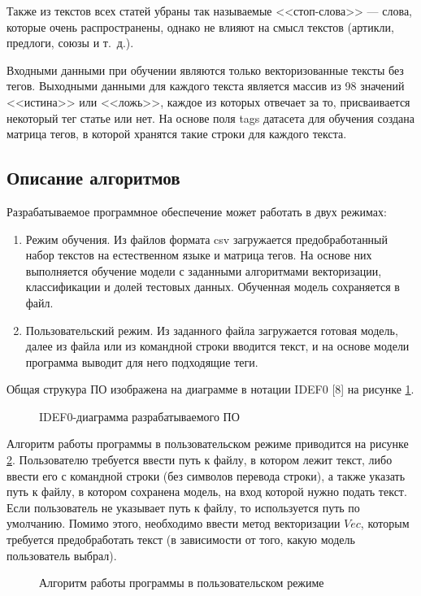 \documentclass[a4paper, 12pt]{article}
\begin{document}
\begin{large}
Также из текстов всех статей убраны так называемые <<стоп-слова>> --- слова, которые очень распространены, однако не влияют на смысл текстов (артикли, предлоги, союзы и т.~д.).

Входными данными при обучении являются только векторизованные тексты без тегов.
Выходными данными для каждого текста является массив из 98 значений <<истина>> или <<ложь>>, каждое из которых отвечает за то, присваивается некоторый тег статье или нет.
На основе поля tags датасета для обучения создана матрица тегов, в которой хранятся такие строки для каждого текста. 
\subsection{Описание алгоритмов}
Разрабатываемое программное обеспечение может работать в двух режимах:
\begin{enumerate}
    \item Режим обучения. Из файлов формата csv загружается предобработанный набор текстов на естественном языке и матрица тегов. На основе них выполняется обучение модели с заданными алгоритмами векторизации, классификации и долей тестовых данных. Обученная модель сохраняется в файл.
    \item Пользовательский режим. Из заданного файла загружается готовая модель, далее из файла или из командной строки вводится текст, и на основе модели программа выводит для него подходящие теги.
\end{enumerate}

Общая струкура ПО изображена на диаграмме в нотации IDEF0 [8] на рисунке \ref{idef}.

\begin{figure}[h!]
    \captionsetup{justification=centering}
    \caption{IDEF0-диаграмма разрабатываемого ПО}
    \label{idef}
\end{figure}

Алгоритм работы программы в пользовательском режиме приводится на рисунке \ref{user}.
Пользователю требуется ввести путь к файлу, в котором лежит текст, либо ввести его с командной строки (без символов перевода строки), а также указать путь к файлу, в котором сохранена модель, на вход которой нужно подать текст. 
Если пользователь не указывает путь к файлу, то используется путь по умолчанию.
Помимо этого, необходимо ввести метод векторизации $Vec$, которым требуется предобработать текст (в зависимости от того, какую модель пользователь выбрал).

\begin{figure}[h!]
    \captionsetup{justification=centering}
    \caption{Алгоритм работы программы в пользовательском режиме}
    \label{user}
\end{figure}


\end{large}
\end{document}
